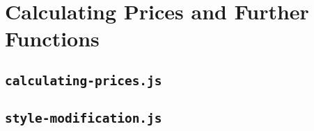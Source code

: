 \section{Calculating Prices and Further Functions}

\subsection{\texttt{calculating-prices.js}}
 

\subsection{\texttt{style-modification.js}}
 